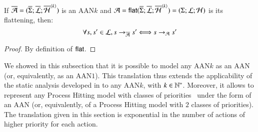 \begin{theorem}
\label{th:bisimPHP}
  If $\ov{\PH} = (\ov{\PHs}; \ov{\PHl}; \ov{\PHa}^{\angles{k}})$ is an AAN$k$
  and $\PH = \PHflat(\ov{\PHs}; \ov{\PHl}; \ov{\PHa}^{\angles{k}}) =
    (\PHs; \PHl; \PHa)$ is its flattening, then:
  \[ \forall s, s' \in \PHl, s \PHPtrans[\oPH] s' \Longleftrightarrow s \PHPtrans[\PH] s' \]
\end{theorem}

\begin{proof}
  By definition of $\PHflat$.
\end{proof}



We showed in this subsection that it is possible to model any AAN$k$
as an AAN (or, equivalently, as an AAN$1$).
This translation thus extends the applicability of the static analysis developed in
 to any AAN$k$, with $k \in \sN^*$.
Moreover, it allows to represent
any Process Hitting model with classes of priorities~\cite{FPMR13-CS2Bio}
under the form of an AAN
(or, equivalently, of a Process Hitting model with $2$ classes of priorities).
The translation given in this section
is exponential in the number of actions of higher priority for each action.
